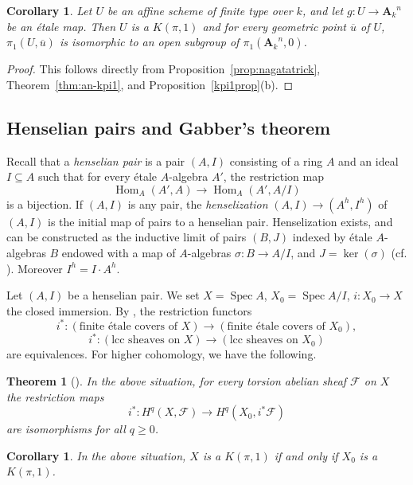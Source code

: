 \documentclass[twoside]{amsart}
\renewcommand{\AA}{\mathbf{A}}
\newcommand{\Ff}{\mathscr{F}}
\DeclareMathOperator{\Spec}{Spec}
\DeclareMathOperator{\Hom}{Hom}
\newcommand{\ANK}[2]{{\AA_{#2}}^{\! \! \! \!  #1}} %
\newcommand{\AN}[1]{\ANK{#1}{k}}
\renewcommand{\to}{\longrightarrow}
\renewcommand{\bar}{\overline}
\theoremstyle{plain}
\newtheorem{theorem}[subsubsection]{Theorem}
\newtheorem{corollary}[subsubsection]{Corollary}
\theoremstyle{definition}
\theoremstyle{remark}
\numberwithin{equation}{subsection}
\begin{document}
\begin{corollary} \label{cor:small-kpi1}
	Let $U$ be an affine scheme of finite type over $k$, and let $g\colon U\to \AN{n}$ be an \'etale map. Then $U$ is a $K(\pi, 1)$ and for every geometric point $\bar u$ of $U$, $\pi_1(U, \bar u)$ is isomorphic to an open subgroup of $\pi_1(\AN n, 0)$.
\end{corollary}

\begin{proof}
This follows directly from Proposition~\ref{prop:nagatatrick}, Theorem~\ref{thm:an-kpi1}, and Proposition~\ref{kpi1prop}(b). 
\end{proof}

\subsection{Henselian pairs and Gabber's theorem}
\label{ss:henselian-pairs}

Recall \cite[Chapitre XI]{RaynaudHenselian} that a \emph{henselian pair} is a pair $(A, I)$ consisting of a ring $A$ and an ideal $I\subseteq A$ such that for every \'etale $A$-algebra $A'$, the restriction map
\[ 
	\Hom_A(A', A)\to \Hom_A(A', A/I)
\]
is a bijection. If $(A, I)$ is any pair, the \emph{henselization} $(A, I)\to (A^h, I^h)$ of $(A, I)$ is the initial map of pairs to a henselian pair. Henselization exists, and can be constructed as the inductive limit of pairs $(B, J)$ indexed by \'etale $A$-algebras $B$ endowed with a map of $A$-algebras $\sigma\colon B\to A/I$, and $J=\ker(\sigma)$ (cf. \cite[\S 0]{Gabber}). Moreover $I^h = I\cdot A^h$.

Let $(A, I)$ be a henselian pair. We set $X=\Spec A$, $X_0=\Spec A/I$, $i\colon X_0\to X$ the closed immersion. By \cite[\S 1]{Gabber}, the restriction functors 
\[ 
	i^* \colon \left( \text{finite \'etale covers of }X\right) 
	\to
	\left( \text{finite \'etale covers of }X_0\right), 
\]
\[ 
	i^*\colon \left(\text{lcc sheaves on }X\right) 
	\to
	\left(\text{lcc sheaves on }X_0\right) 
\]
are equivalences. For higher cohomology, we have the following.

\begin{theorem}[{\cite[Theorem 1]{Gabber}}] \label{thm:gabber-affine-analog}
	In the above situation, for every torsion abelian sheaf $\Ff$ on $X$ the restriction maps
	\[ 
		i^* \colon H^q(X, \Ff) \to H^q(X_0, i^* \Ff)
	\]
	are isomorphisms for all $q\geq 0$.
\end{theorem}

\begin{corollary} \label{cor:henselian-pairs}
	In the above situation, $X$ is a $K(\pi, 1)$ if and only if $X_0$ is a $K(\pi, 1)$.
\end{corollary}
\end{document}
